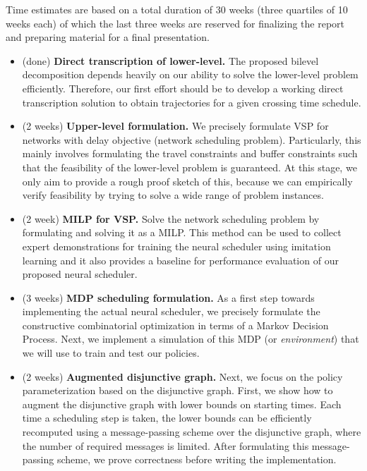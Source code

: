 \documentclass{article}
\theoremstyle{definition}
\theoremstyle{plain}
\begin{document}
Time estimates are based on a total duration of 30 weeks (three quartiles of 10
weeks each) of which the last three weeks are reserved for finalizing the report and
preparing material for a final presentation.

\begin{itemize}
  \item (done) \textbf{Direct transcription of lower-level.} The proposed bilevel
        decomposition depends heavily on our ability to solve the lower-level
        problem efficiently. Therefore, our first effort should be to develop a
        working direct transcription solution to obtain trajectories for a given
        crossing time schedule.

  \item (2 weeks) \textbf{Upper-level formulation.} We precisely formulate VSP for networks
        with delay objective (network scheduling problem). Particularly, this
        mainly involves formulating the travel constraints and buffer
        constraints such that the feasibility of the lower-level problem is
        guaranteed. At this stage, we only aim to provide a rough proof sketch
        of this, because we can empirically verify feasibility by trying to
        solve a wide range of problem instances.


  \item (2 week) \textbf{MILP for VSP.} Solve the network scheduling problem by formulating and
        solving it as a MILP. This method can be used to collect expert
        demonstrations for training the neural scheduler using imitation
        learning and it also provides a baseline for performance evaluation of
        our proposed neural scheduler.

  \item (3 weeks) \textbf{MDP scheduling formulation.} As a first step towards implementing
        the actual neural scheduler, we precisely formulate the constructive
        combinatorial optimization in terms of a Markov Decision Process. Next,
        we implement a simulation of this MDP (or \textit{environment}) that we will
        use to train and test our policies.

  \item (2 weeks) \textbf{Augmented disjunctive graph.} Next, we focus on the policy
        parameterization based on the disjunctive graph. First, we show how to
        augment the disjunctive graph with lower bounds on starting times. Each
        time a scheduling step is taken, the lower bounds can be efficiently
        recomputed using a message-passing scheme over the disjunctive graph,
        where the number of required messages is limited. After formulating this
        message-passing scheme, we prove correctness before writing the
        implementation.


\end{itemize}
\end{document}
